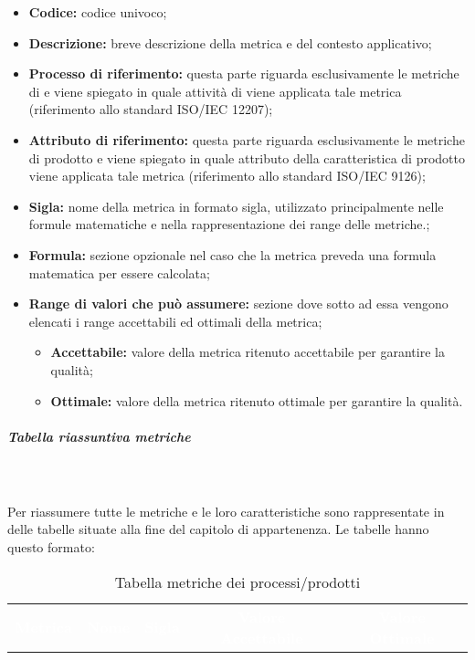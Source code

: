 \begin{itemize}
    \item \textbf{Codice:} codice univoco;
    \item \textbf{Descrizione:} breve descrizione della metrica e del contesto applicativo;
    \item \textbf{Processo di riferimento:} questa parte riguarda esclusivamente le metriche di  e viene spiegato in quale attività di  viene applicata tale metrica (riferimento allo standard ISO/IEC 12207);
    \item \textbf{Attributo di riferimento:} questa parte riguarda esclusivamente le metriche di prodotto e viene spiegato in quale attributo della caratteristica di prodotto viene applicata tale metrica (riferimento allo standard ISO/IEC 9126);
    \item \textbf{Sigla:} nome della metrica in formato sigla, utilizzato principalmente nelle formule matematiche e nella rappresentazione dei range delle metriche.;
    \item \textbf{Formula:} sezione opzionale nel caso che la metrica preveda una formula matematica per essere calcolata;
    \item \textbf{Range di valori che può assumere:} sezione dove sotto ad essa vengono elencati i range accettabili ed ottimali della metrica;
    \begin{itemize}
        \item \textbf{Accettabile:} valore della metrica ritenuto accettabile per garantire la qualità;
        \item \textbf{Ottimale:} valore della metrica ritenuto ottimale per garantire la qualità.
    \end{itemize}
\end{itemize} 

\subparagraph{Tabella riassuntiva metriche}\mbox{}\\ \\
Per riassumere tutte le metriche e le loro caratteristiche sono rappresentate in delle tabelle situate alla fine del capitolo di appartenenza. Le tabelle hanno questo formato:

{
\renewcommand{\arraystretch}{1.5}
\begin{longtable}{ c C{4cm} c c c}
\caption{Tabella metriche dei processi/prodotti}\\
\textcolor{white}{\textbf{Metrica}} & \textcolor{white}{\textbf{Nome}} & \textcolor{white}{\textbf{Sigla}} & \textcolor{white}{\textbf{Valore Accettabile}} & \textcolor{white}{\textbf{Valore Ottimale}}\\
\end{longtable}
}

